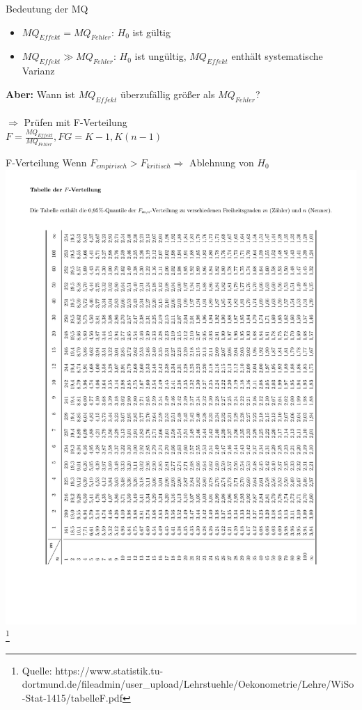 \documentclass{beamer}
\begin{document}
	\begin{frame}{Bedeutung der MQ}
		\begin{itemize}\itemsep=2ex
			\item $MQ_{Effekt} = MQ_{Fehler}$: $H_0$ ist gültig
			\item $MQ_{Effekt} \gg MQ_{Fehler}$: $H_0$ ist ungültig, $MQ_{Effekt}$ enthält systematische Varianz
		\end{itemize}
		\begin{center}
			\textbf{Aber:} Wann ist $MQ_{Effekt}$ überzufällig größer als $MQ_{Fehler}$?
			\pause\\ \hfill\\ $\Rightarrow$ Prüfen mit F-Verteilung \vspace{2ex} \\
			$F = \frac{MQ_{Effekt}}{MQ_{Fehler}}, FG=K-1,K(n-1)$
		\end{center}
		
	\end{frame}
	
	\begin{frame}{F-Verteilung}
		Wenn $F_{empirisch} > F_{kritisch} \Rightarrow $ Ablehnung von $H_0$
		\includegraphics[trim=60 100 240 190,clip,angle=270,origin=c, width=\textwidth]{Bilder/F-verteilung}
		\let\thefootnote\relax\footnote{{\fontsize{5}{5} \selectfont \vspace{-5ex}
				Quelle: https://www.statistik.tu-dortmund.de/fileadmin/user\_upload/Lehrstuehle/Oekonometrie/Lehre/WiSo-Stat-1415/tabelleF.pdf}}
	\end{frame}
	
\end{document}
